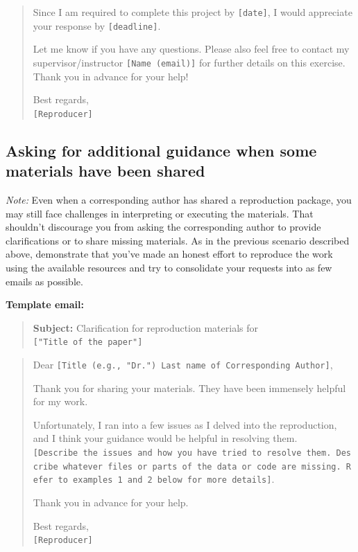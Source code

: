 \documentclass[
]{book}
\begin{document}
\begin{quote}
Since I am required to complete this project by \texttt{{[}date{]}}, I would appreciate your response by \texttt{{[}deadline{]}}.

Let me know if you have any questions. Please also feel free to contact my supervisor/instructor \texttt{{[}Name\ (email){]}} for further details on this exercise. Thank you in advance for your help!

Best regards,\\
\texttt{{[}Reproducer{]}}
\end{quote}

\hypertarget{asking-for-additional-guidance-when-some-materials-have-been-shared}{%
\subsection{Asking for additional guidance when some materials have been shared}\label{asking-for-additional-guidance-when-some-materials-have-been-shared}}

\emph{Note:} Even when a corresponding author has shared a reproduction package, you may still face challenges in interpreting or executing the materials. That shouldn't discourage you from asking the corresponding author to provide clarifications or to share missing materials. As in the previous scenario described above, demonstrate that you've made an honest effort to reproduce the work using the available resources and try to consolidate your requests into as few emails as possible.

\textbf{Template email:}

\begin{quote}
\textbf{Subject:} Clarification for reproduction materials for \texttt{{[}"Title\ of\ the\ paper"{]}}
\end{quote}

\begin{quote}
Dear \texttt{{[}Title\ (e.g.,\ "Dr.")\ Last\ name\ of\ Corresponding\ Author{]}},

Thank you for sharing your materials. They have been immensely helpful for my work.

Unfortunately, I ran into a few issues as I delved into the reproduction, and I think your guidance would be helpful in resolving them. \texttt{{[}Describe\ the\ issues\ and\ how\ you\ have\ tried\ to\ resolve\ them.\ Describe\ whatever\ files\ or\ parts\ of\ the\ data\ or\ code\ are\ missing.\ Refer\ to\ examples\ 1\ and\ 2\ below\ for\ more\ details{]}}.

Thank you in advance for your help.

Best regards,\\
\texttt{{[}Reproducer{]}}
\end{quote}
\end{document}
